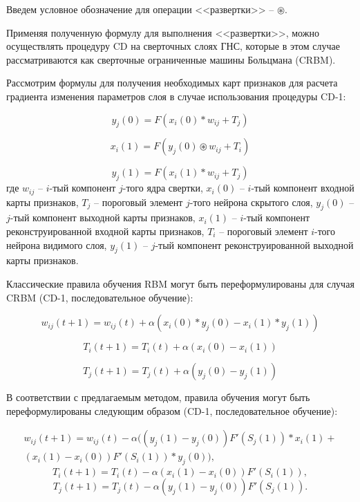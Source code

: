 Введем условное обозначение для операции <<развертки>> -- $\circledast$.

Применяя полученную формулу для выполнения <<развертки>>, можно осуществлять процедуру CD на сверточных слоях ГНС, которые в этом случае рассматриваются как сверточные ограниченные машины Больцмана (CRBM). 

Рассмотрим формулы для получения необходимых карт признаков для расчета градиента изменения параметров слоя в случае использования процедуры CD-1: 

\begin{equation*}
    y_j(0) = F(x_i(0) * w_{ij} + T_j)
\end{equation*}

\begin{equation*}
    x_i(1) = F(y_j(0) \circledast w_{ij} + T_i)
\end{equation*}

\begin{equation*}
    y_j(1) = F(x_i(1) * w_{ij} + T_j)
\end{equation*}
где $w_{ij}$ -- $i$-тый компонент $j$-того ядра свертки, $x_i(0)$ -- $i$-тый компонент входной карты признаков, $T_j$ -- пороговый элемент $j$-того нейрона скрытого слоя, $y_j(0)$ -- $j$-тый компонент выходной карты признаков, $x_i(1)$ -- $i$-тый компонент реконструированной входной карты признаков, $T_i$ -- пороговый элемент $i$-того нейрона видимого слоя, $y_j(1)$ -- $j$-тый компонент реконструированной выходной карты признаков.

Классические правила обучения RBM могут быть переформулированы для случая CRBM (CD-1, последовательное обучение): 

\begin{equation*}
		w_{ij}(t+1)=w_{ij}(t)+\alpha(x_i(0) * y_j(0)-x_i(1) * y_j(1))
\end{equation*} 

\begin{equation*}	
		T_i(t+1)=T_i(t)+\alpha(x_i(0)-x_i(1))
\end{equation*} 

\begin{equation*}		
		T_j(t+1)=T_j(t)+\alpha(y_j(0)-y_j(1))
\end{equation*}

В соответствии с предлагаемым методом, правила обучения могут быть переформулированы следующим образом (CD-1, последовательное обучение):

\begin{multline*}
    w_{ij}(t+1)=w_{ij}(t)-\alpha((y_j(1)-y_j(0))F'(S_j(1)) * x_i(1)+\\(x_i(1)-x_i(0))F'(S_i(1)) * y_j(0)),    
\end{multline*}
\begin{equation*}
    T_i(t+1)=T_i(t)-\alpha(x_i(1)-x_i(0))F'(S_i(1)),
\end{equation*}
\begin{equation*}
    T_j(t+1)=T_j(t)-\alpha(y_j(1)-y_j(0))F'(S_j(1)).  
\end{equation*}

